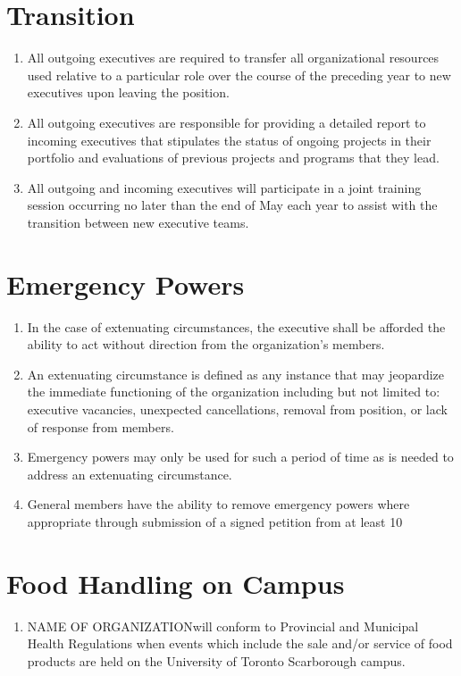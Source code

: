 \documentclass[12pt]{article}
\newcommand{\orgname}{NAME OF ORGANIZATION\space}
\begin{document}
\section{Transition}
\begin{enumerate}[{12}.1]
    \item	All outgoing executives are required to transfer all organizational resources used relative to a particular role over the course of the preceding year to new executives upon leaving the position. 
    \item	All outgoing executives are responsible for providing a detailed report to incoming executives that stipulates the status of ongoing projects in their portfolio and evaluations of previous projects and programs that they lead.
    \item	All outgoing and incoming executives will participate in a joint training session occurring no later than the end of May each year to assist with the transition between new executive teams.
\end{enumerate}


\section{Emergency Powers}
\begin{enumerate}[{13}.1]
    \item	In the case of extenuating circumstances, the executive shall be afforded the ability to act without direction from the organization’s members. 
    \item	An extenuating circumstance is defined as any instance that may jeopardize the immediate functioning of the organization including but not limited to: executive vacancies, unexpected cancellations, removal from position, or lack of response from members.
    \item	Emergency powers may only be used for such a period of time as is needed to address an extenuating circumstance. 
    \item	General members have the ability to remove emergency powers where appropriate through submission of a signed petition from at least 10%
\end{enumerate}


\section{Food Handling on Campus}
\begin{enumerate}[{14}.1]
    \item \orgname will conform to Provincial and Municipal Health Regulations when events which include the sale and/or service of food products are held on the University of Toronto Scarborough campus.
\end{enumerate}
\end{document}
